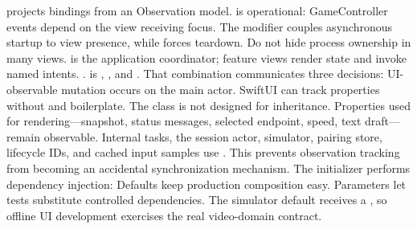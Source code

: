 {} projects bindings from an Observation model.  is operational: GameController events depend on the view receiving focus. The  modifier couples asynchronous startup to view presence, while  forces teardown.\markdownRendererParagraphSeparator
{}Do not hide process ownership in many views.  is the application coordinator; feature views render state and invoke named intents.\markdownRendererInterblockSeparator
{}
\markdownRendererSectionEnd \markdownRendererSectionBegin
{}\markdownRendererInterblockSeparator
{}\markdownRendererBlockQuoteBegin
{} .\markdownRendererBlockQuoteEnd \markdownRendererInterblockSeparator
{} is , , and . That combination communicates three decisions:\markdownRendererInterblockSeparator
{}\markdownRendererOlBegin
{}UI-observable mutation occurs on the main actor.\markdownRendererOlItemEnd 
{}SwiftUI can track properties without  and  boilerplate.\markdownRendererOlItemEnd 
{}The class is not designed for inheritance.\markdownRendererOlItemEnd 
\markdownRendererOlEnd \markdownRendererInterblockSeparator
{}Properties used for rendering—snapshot, status messages, selected endpoint, speed, text draft—remain observable. Internal tasks, the session actor, simulator, pairing store, lifecycle IDs, and cached input samples use . This prevents observation tracking from becoming an accidental synchronization mechanism.\markdownRendererParagraphSeparator
{}The initializer performs dependency injection:\markdownRendererInterblockSeparator
{}\markdownRendererInterblockSeparator
{}Defaults keep production composition easy. Parameters let tests substitute controlled dependencies. The simulator default receives a , so offline UI development exercises the real video-domain contract.\markdownRendererParagraphSeparator
